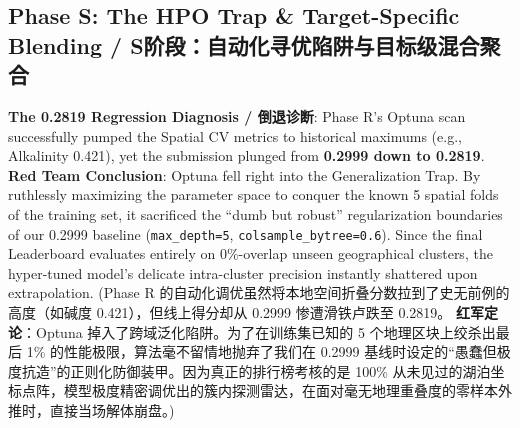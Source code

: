 \subsection{Phase S: The HPO Trap \& Target-Specific Blending / S阶段：自动化寻优陷阱与目标级混合聚合}

\begin{warningbox}
\textbf{The 0.2819 Regression Diagnosis / 倒退诊断}:
Phase R’s Optuna scan successfully pumped the Spatial CV metrics to historical maximums (e.g., Alkalinity 0.421), yet the submission plunged from \textbf{0.2999 down to 0.2819}. \\
\textbf{Red Team Conclusion}: Optuna fell right into the Generalization Trap. By ruthlessly maximizing the parameter space to conquer the known 5 spatial folds of the training set, it sacrificed the “dumb but robust” regularization boundaries of our 0.2999 baseline (\texttt{max\_depth=5}, \texttt{colsample\_bytree=0.6}). Since the final Leaderboard evaluates entirely on 0\%-overlap unseen geographical clusters, the hyper-tuned model’s delicate intra-cluster precision instantly shattered upon extrapolation. 
(Phase R 的自动化调优虽然将本地空间折叠分数拉到了史无前例的高度（如碱度 0.421），但线上得分却从 0.2999 惨遭滑铁卢跌至 0.2819。
\textbf{红军定论}：Optuna 掉入了跨域泛化陷阱。为了在训练集已知的 5 个地理区块上绞杀出最后 1\% 的性能极限，算法毫不留情地抛弃了我们在 0.2999 基线时设定的“愚蠢但极度抗造”的正则化防御装甲。因为真正的排行榜考核的是 100\% 从未见过的湖泊坐标点阵，模型极度精密调优出的簇内探测雷达，在面对毫无地理重叠度的零样本外推时，直接当场解体崩盘。)
\end{warningbox}

